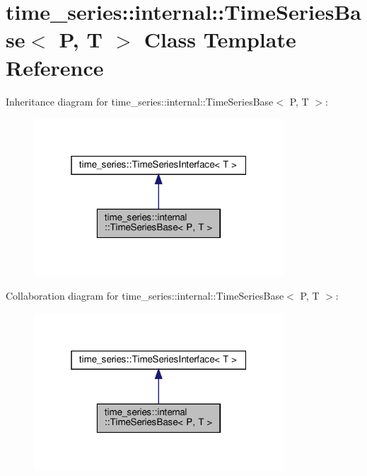 \hypertarget{classtime__series_1_1internal_1_1TimeSeriesBase}{}\section{time\+\_\+series\+:\+:internal\+:\+:Time\+Series\+Base$<$ P, T $>$ Class Template Reference}
\label{classtime__series_1_1internal_1_1TimeSeriesBase}


Inheritance diagram for time\+\_\+series\+:\+:internal\+:\+:Time\+Series\+Base$<$ P, T $>$\+:
\nopagebreak
\begin{figure}[H]
\begin{center}
\leavevmode
\includegraphics[width=265pt]{classtime__series_1_1internal_1_1TimeSeriesBase__inherit__graph}
\end{center}
\end{figure}


Collaboration diagram for time\+\_\+series\+:\+:internal\+:\+:Time\+Series\+Base$<$ P, T $>$\+:
\nopagebreak
\begin{figure}[H]
\begin{center}
\leavevmode
\includegraphics[width=265pt]{classtime__series_1_1internal_1_1TimeSeriesBase__coll__graph}
\end{center}
\end{figure}
